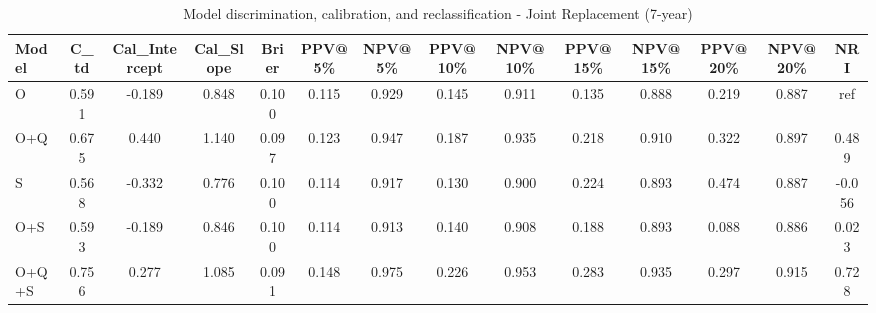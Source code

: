 \begin{table}[htbp]
\centering
\small
\caption{Model discrimination, calibration, and reclassification - Joint Replacement (7-year)}
\label{tab:perf_joint_7y}
\begin{tabular}{lccccccccccccc}
\toprule
Model & C\_td & Cal\_Intercept & Cal\_Slope & Brier & PPV@5\% & NPV@5\% & PPV@10\% & NPV@10\% & PPV@15\% & NPV@15\% & PPV@20\% & NPV@20\% & NRI \\
\midrule
O & 0.591 & -0.189 & 0.848 & 0.100 & 0.115 & 0.929 & 0.145 & 0.911 & 0.135 & 0.888 & 0.219 & 0.887 & ref \\
O+Q & 0.675 & 0.440 & 1.140 & 0.097 & 0.123 & 0.947 & 0.187 & 0.935 & 0.218 & 0.910 & 0.322 & 0.897 & 0.489 \\
S & 0.568 & -0.332 & 0.776 & 0.100 & 0.114 & 0.917 & 0.130 & 0.900 & 0.224 & 0.893 & 0.474 & 0.887 & -0.056 \\
O+S & 0.593 & -0.189 & 0.846 & 0.100 & 0.114 & 0.913 & 0.140 & 0.908 & 0.188 & 0.893 & 0.088 & 0.886 & 0.023 \\
O+Q+S & 0.756 & 0.277 & 1.085 & 0.091 & 0.148 & 0.975 & 0.226 & 0.953 & 0.283 & 0.935 & 0.297 & 0.915 & 0.728 \\
\bottomrule
\end{tabular}
\end{table}